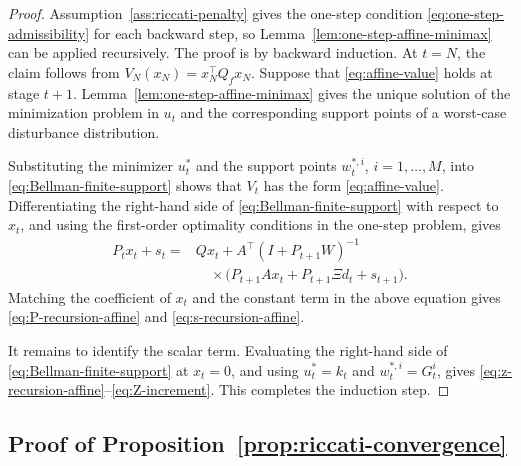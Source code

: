 \documentclass[10pt,journal,twoside]{IEEEtran}
\theoremstyle{definition}
\theoremstyle{remark}
\begin{document}
\begin{proof} Assumption~\ref{ass:riccati-penalty} gives the one-step condition \eqref{eq:one-step-admissibility} for each backward step, so Lemma~\ref{lem:one-step-affine-minimax} can be applied recursively.
	The proof is by backward induction. At \(t=N\), the claim follows from
	\(V_N(x_N)=x_N^\top Q_fx_N\). Suppose that
	\eqref{eq:affine-value} holds at stage \(t+1\).
	Lemma~\ref{lem:one-step-affine-minimax} gives the unique solution of the minimization problem in \(u_t\) and the corresponding support points of a worst-case disturbance distribution.
	
	Substituting the minimizer \(u_t^{*}\) and the support points
\(w_t^{*,i}\), \(i=1,\ldots,M\), into \eqref{eq:Bellman-finite-support}
	shows that \(V_t\) has the form \eqref{eq:affine-value}. Differentiating
	the right-hand side of \eqref{eq:Bellman-finite-support} with respect to
	\(x_t\), and using the first-order optimality conditions in the
	one-step problem, gives
	\begin{align*}
			P_tx_t+s_t
			={}&
			Qx_t
			+A^\top
			(I+P_{t+1}W)^{-1} \\
			&\quad\times
			\big(
			P_{t+1}A x_t
			+P_{t+1}\Xi d_t
			+s_{t+1}
			\big).
	\end{align*}
	Matching the coefficient of \(x_t\) and the constant term in the above equation gives
	\eqref{eq:P-recursion-affine} and \eqref{eq:s-recursion-affine}.
	
	It remains to identify the scalar term. Evaluating the right-hand side
	of \eqref{eq:Bellman-finite-support} at \(x_t=0\), and using
	\(u_t^*=k_t\) and \(w_t^{*,i}=G_t^i\), gives
	\eqref{eq:z-recursion-affine}--\eqref{eq:Z-increment}. This completes
	the induction step. 
\end{proof}



\subsection{Proof of Proposition~\ref{prop:riccati-convergence}}
\label{app:pro1}
\end{document}
